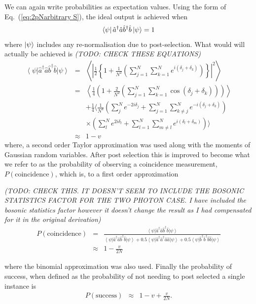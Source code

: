 \documentclass[aps,pra,twocolumn,superscriptaddress,numerical,floatfix]{revtex4-1}
\begin{document}
We can again write probabilities as expectation values.  Using the form of Eq.~(\ref{eq:2pNarbitrary S}), the ideal output is achieved when
\begin{equation}
\bra{\psi}\hat{a}^{\dagger}\hat{a}\hat{b}^{\dagger}\hat{b}\ket{\psi} = 1
\end{equation}
where $\ket{\psi}$ includes any re-normalisation due to post-selection. What would will actually be achieved is
\emph{(TODO: CHECK THESE EQUATIONS)}
\begin{eqnarray}
\left\langle \psi\right|\hat{a}^{\dagger}\hat{a}\hat{b}^{\dagger}\hat{b}\left|\psi\right\rangle & = & \left\langle \left|\frac{1}{2}\left\{ 1+\frac{1}{N^{2}}\left(\sum_{j=1}^{N}\sum_{k=1}^{N}e^{i(\delta_{j}+\delta_{k})}\right)\right\} \right|^{2}\right\rangle \nonumber \\
& = & \left\langle \frac{1}{4}\left(1+\frac{2}{N^{2}}\left(\sum_{j=1}^{N}\sum_{k=1}^{N}\cos\left(\delta_{j}+\delta_{k}\right)\right)\right)\right\rangle \nonumber \\
&  & +\frac{1}{4}\Biggl\langle\frac{1}{N^{4}}\left(\sum_{j}^{N}e^{-2i\delta_{j}}+\sum_{j=1}^{N}\sum_{k\ne j}^{N}e^{-i(\delta_{j}+\delta_{k})}\right)\nonumber \\
&  & \times\left(\sum_{l}^{N}e^{2i\delta_{l}}+\sum_{l=1}^{N}\sum_{m\ne l}^{N}e^{i(\delta_{l}+\delta_{m})}\right)\Biggr\rangle\nonumber \\
& \approx & 1-v\label{eq:exp. value aabb}
\end{eqnarray}
where, a second order Taylor approximation was used along with the moments of Gaussian random variables. After post selection this is improved to become what we refer to as the probability of observing a coincidence measurement, $P(\textrm{coincidence})$, which is, to a first order approximation
\begin{widetext}
\emph{(TODO: CHECK THIS.  IT DOESN'T SEEM TO INCLUDE THE BOSONIC STATISTICS FACTOR FOR THE TWO PHOTON CASE. I have included the bosonic statistics factor however it doesn't change the result as I had compensated for it in the original derivation)}
\begin{eqnarray}
P(\textrm{coincidence}) & = & \frac{\left\langle \psi\right|\hat{a}^{\dagger}\hat{a}\hat{b}^{\dagger}\hat{b}\left|\psi\right\rangle }{\left\langle \psi\right|\hat{a}^{\dagger}\hat{a}\hat{b}^{\dagger}\hat{b}\left|\psi\right\rangle +0.5\left\langle \psi\right|\hat{a}^{\dagger}\hat{a}^{\dagger}\hat{a}\hat{a}\left|\psi\right\rangle +0.5\left\langle \psi\right|\hat{b}^{\dagger}\hat{b}^{\dagger}\hat{b}\hat{b}\left|\psi\right\rangle }\nonumber \\
& \approx & 1-\frac{v}{2N}\label{eq:2pNarb PS}
\end{eqnarray}
\end{widetext}
where the binomial approximation was also used.  Finally the probability of success, when defined as the probability of not needing to post selected a single instance is
\begin{eqnarray}
	P(\textrm{success}) & \approx & 1-v+\frac{v}{2N}.\label{eq:2pNarb Success}
\end{eqnarray}
\end{document}
